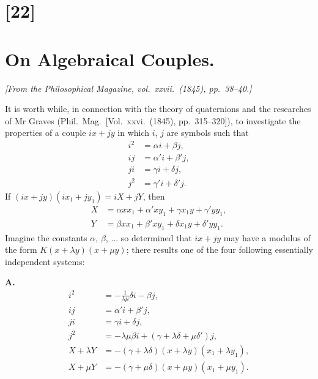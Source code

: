 \documentclass[12pt,a4paper]{article}
\begin{document}
\newpage
\section*{[22]}
\section*{On Algebraical Couples.}

\textit{[From the Philosophical Magazine, vol.~xxvii.~(1845), pp.~38--40.]}

\bigskip
\setcounter{page}{128}

It is worth while, in connection with the theory of quaternions and the researches of Mr Graves (Phil.\ Mag.\ [Vol.~xxvi.~(1845), pp.~315--320]), to investigate the properties of a couple $ix + jy$ in which $i$, $j$ are symbols such that
\begin{align*}
i^2 &= \alpha i + \beta j,\\
ij &= \alpha' i + \beta' j,\\
ji &= \gamma i + \delta j,\\
j^2 &= \gamma' i + \delta' j.
\end{align*}
If $(ix + jy)(ix_1 + jy_1) = iX + jY$, then
\begin{align*}
X &= \alpha xx_1 + \alpha' xy_1 + \gamma x_1 y + \gamma' y y_1,\\
Y &= \beta xx_1 + \beta' xy_1 + \delta x_1 y + \delta' y y_1.
\end{align*}
Imagine the constants $\alpha$, $\beta$, $\ldots$ so determined that $ix + jy$ may have a modulus of the form $K(x + \lambda y)(x + \mu y)$; there results one of the four following essentially independent systems:

\medskip
\textbf{A.}
\begin{align*}
i^2 &= -\tfrac{1}{\lambda\mu}\delta i - \beta j,\\
ij &= \alpha' i + \beta' j,\\
ji &= \gamma i + \delta j,\\
j^2 &= -\lambda\mu\beta i + (\gamma + \lambda\delta + \mu\delta')j,\\
X + \lambda Y &= -(\gamma + \lambda\delta)(x + \lambda y)(x_1 + \lambda y_1),\\
X + \mu Y &= -(\gamma + \mu\delta)(x + \mu y)(x_1 + \mu y_1).
\end{align*}
\end{document}
